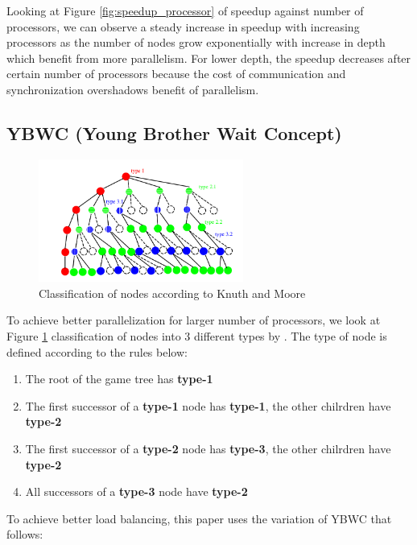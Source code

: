 \documentclass[12pt]{article}
\begin{document}
Looking at Figure \ref{fig:speedup_processor} of speedup against number of processors, we can observe a steady
increase in speedup with increasing processors as the number of nodes grow
exponentially with increase in depth which benefit from more parallelism. For
lower depth, the speedup decreases after certain number of processors because
the cost of communication and synchronization overshadows benefit of parallelism.

\subsection{YBWC (Young Brother Wait Concept)}

\begin{figure}[H]
  \centering
  \includegraphics[width=0.6\textwidth, height=0.4\textwidth]{classification_nodes.png}
  \caption{Classification of nodes according to Knuth and Moore}
  \label{fig:classification_nodes}
\end{figure}

To achieve better parallelization for larger number of processors, we look at
Figure \ref{fig:classification_nodes} classification of nodes into 3 different
types by \cite{knuth1975analysis}. The type of node is defined according to the
rules below:

\begin{enumerate}
  \item The root of the game tree has \textbf{type-1} 
  \item The first successor of a \textbf{type-1} node has \textbf{type-1}, the
    other chilrdren have \textbf{type-2}
  \item The first successor of a \textbf{type-2} node has \textbf{type-3}, the
    other chilrdren have \textbf{type-2}
  \item All successors of a \textbf{type-3} node have \textbf{type-2} 
\end{enumerate}

\noindent To achieve better load balancing, this paper uses the variation of
YBWC \cite{feldmann1993game} that follows:
\end{document}
